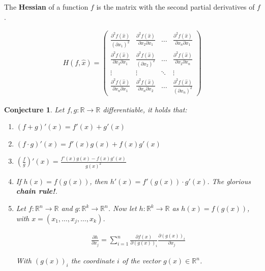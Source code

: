 \documentclass[aspectratio=169]{beamer}
\newtheorem{proposition}{Conjecture}[section]
\begin{document}
\begin{frame}
    \begin{definition}
        The \textbf{Hessian} of a function $f$ is the matrix with the second partial derivatives of $f$.
        
        \begin{align*}
            H(f,\hat{x})=\left(
            \begin{array}{cccc}
                \frac{\partial^2f(\hat{x})}{(\partial x_1)^2} & \frac{\partial^2f(\hat{x})}{\partial x_2\partial x_1}&\ldots&\frac{\partial^2f(\hat{x})}{\partial x_n\partial x_1}\\
                \frac{\partial^2f(\hat{x})}{\partial x_2\partial x_1} & \frac{\partial^2f(\hat{x})}{(\partial x_2)^2} & \ldots & \frac{\partial^2f(\hat{x})}{\partial x_2\partial x_n}\\
                \vdots & \vdots &\ddots & \vdots\\
                \frac{\partial^2f(\hat{x})}{\partial x_n\partial x_1} & \frac{\partial^2f(\hat{x})}{\partial x_n\partial x_2}&\ldots &\frac{\partial^2f(\hat{x})}{(\partial x_n)^2}
            \end{array}
            \right)
        \end{align*}
        
    \end{definition}
\end{frame}

\begin{frame}

\begin{proposition}
    Let $f,g:\mathbb{R}\rightarrow\mathbb{R}$ differentiable, it holds that:
    
    \begin{enumerate}
        \item $(f+g)'(x)=f'(x)+g'(x)$
        \item $(f\cdot g)'(x)=f'(x)g(x)+f(x)g'(x)$
        \item $\left(\frac{f}{g}\right)'(x)=\frac{f'(x)g(x)-f(x)g'(x)}{g(x)^2}$
        \item If $h(x)=f(g(x))$, then $h'(x)=f'(g(x))\cdot g'(x)$. The glorious \textbf{chain rule!}.
        \item Let $f:\mathbb{R}^n\rightarrow\mathbb{R}$ and $g:\mathbb{R}^k\rightarrow\mathbb{R}^n$. Now let $h:\mathbb{R}^k\rightarrow\mathbb{R}$ as $h(x)=f(g(x))$, with $x=(x_1,\ldots, x_j,\ldots, x_k)$.
        
        \begin{align*}
            \frac{\partial h}{\partial x_j} = \sum_{i=1}^n \frac{\partial f(x)}{\partial (g(x))_i}\frac{\partial (g(x))_i}{\partial x_j}
        \end{align*}
        
        With $(g(x))_i$ the coordinate $i$ of the vector $g(x)\in\mathbb{R}^n$.
    \end{enumerate}
\end{proposition}
    
\end{frame}
\end{document}
